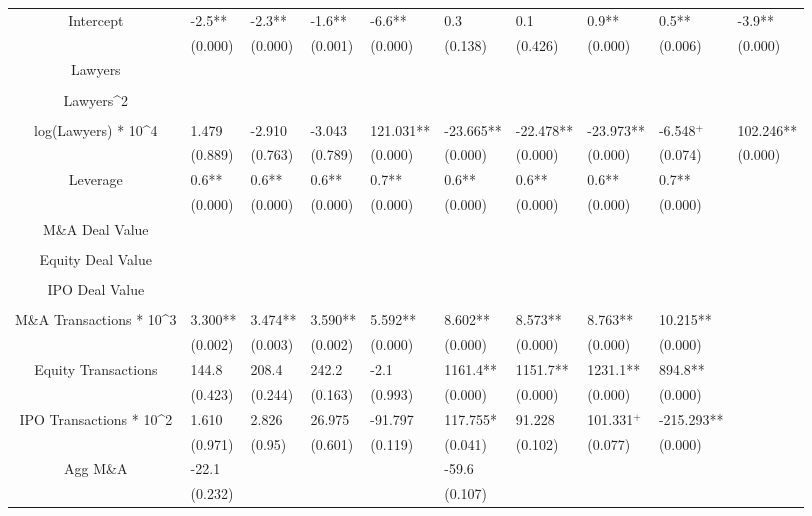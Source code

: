 \documentclass{article}
\begin{document}
\begin{table}[H]
\begin{tabular}{|clllllllll|}
Intercept & -2.5** & -2.3** & -1.6** & -6.6** & 0.3 & 0.1 & 0.9** & 0.5** & -3.9** \\ 
   & (0.000) & (0.000) & (0.001) & (0.000) & (0.138) & (0.426) & (0.000) & (0.006) & (0.000) \\ 
  Lawyers &  &  &  &  &  &  &  &  &  \\ 
   &  &  &  &  &  &  &  &  &  \\ 
  Lawyers^2 &  &  &  &  &  &  &  &  &  \\ 
   &  &  &  &  &  &  &  &  &  \\ 
  log(Lawyers) * 10^4 & 1.479 & -2.910 & -3.043 & 121.031** & -23.665** & -22.478** & -23.973** & -6.548$^{+}$ & 102.246** \\ 
   & (0.889) & (0.763) & (0.789) & (0.000) & (0.000) & (0.000) & (0.000) & (0.074) & (0.000) \\ 
  Leverage & 0.6** & 0.6** & 0.6** & 0.7** & 0.6** & 0.6** & 0.6** & 0.7** &  \\ 
   & (0.000) & (0.000) & (0.000) & (0.000) & (0.000) & (0.000) & (0.000) & (0.000) &  \\ 
  M\&A Deal Value &  &  &  &  &  &  &  &  &  \\ 
   &  &  &  &  &  &  &  &  &  \\ 
  Equity Deal Value &  &  &  &  &  &  &  &  &  \\ 
   &  &  &  &  &  &  &  &  &  \\ 
  IPO Deal Value &  &  &  &  &  &  &  &  &  \\ 
   &  &  &  &  &  &  &  &  &  \\ 
  M\&A Transactions * 10^3 & 3.300** & 3.474** & 3.590** & 5.592** & 8.602** & 8.573** & 8.763** & 10.215** &  \\ 
   & (0.002) & (0.003) & (0.002) & (0.000) & (0.000) & (0.000) & (0.000) & (0.000) &  \\ 
  Equity Transactions & 144.8 & 208.4 & 242.2 & -2.1 & 1161.4** & 1151.7** & 1231.1** & 894.8** &  \\ 
   & (0.423) & (0.244) & (0.163) & (0.993) & (0.000) & (0.000) & (0.000) & (0.000) &  \\ 
  IPO Transactions * 10^2 & 1.610 & 2.826 & 26.975 & -91.797 & 117.755* & 91.228 & 101.331$^{+}$ & -215.293** &  \\ 
   & (0.971) & (0.95) & (0.601) & (0.119) & (0.041) & (0.102) & (0.077) & (0.000) &  \\ 
  Agg M\&A & -22.1 &  &  &  & -59.6 &  &  &  &  \\ 
   & (0.232) &  &  &  & (0.107) &  &  &  &  \\ 

\end{tabular}
\end{table}
\end{document}

